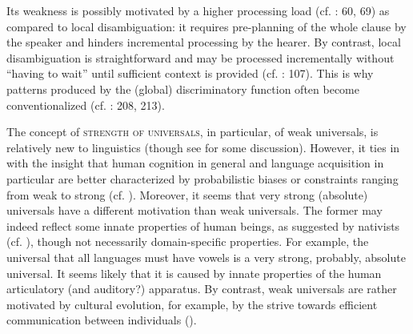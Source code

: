 \documentclass[output=paper]{langsci/langscibook}
\begin{document}
Its weakness is possibly motivated by a higher processing load (cf. \citealt{Hawkins2014}: 60, 69) as compared to local disambiguation: it requires pre-planning of the whole clause by the speaker and hinders incremental processing by the hearer. By contrast, local disambiguation is straightforward and may be processed incrementally without “having to wait” until sufficient context is provided (cf. \citealt{Bornkessel-SchlesewskySchlesewsky2014}: 107). This is why patterns produced by the (global) discriminatory function often become conventionalized (cf. \citealt{Aissen2003,ZeevatJäger2002,Jäger2004,Malchukov2008}: 208, 213).

The concept of \textsc{strength of universals}, in particular, of weak universals, is relatively new to linguistics (though see \citealt{Bickel2013} for some discussion). However, it ties in with the insight that human cognition in general and language acquisition in particular are better characterized by probabilistic biases or constraints ranging from weak to strong (cf. \citealt{ThompsonEtAl2016}). Moreover, it seems that very strong (absolute) universals have a different motivation than weak universals. The former may indeed reflect some innate properties of human beings, as suggested by nativists (cf. \citealt{Chomsky1965}), though not necessarily domain-specific properties. For example, the universal that all languages must have vowels \citep[19]{Comrie1989} is a very strong, probably, absolute universal. It seems likely that it is caused by innate properties of the human articulatory (and auditory?) apparatus. By contrast, weak universals are rather motivated by cultural evolution, for example, by the strive towards efficient communication between individuals (). 
\end{document}
